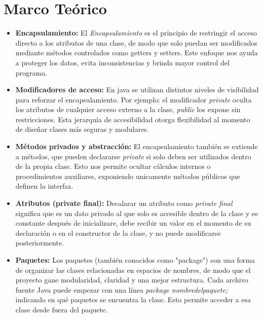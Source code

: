 \documentclass[letterpaper,12pt]{article}
\begin{document}
\section{Marco Teórico}
    \begin{itemize}
        \item \textbf{Encapsulamiento: } El \textit{Encapsulamiento} es el principio de restringir el acceso directo a los atributos de una clase, de modo que solo puedan ser modificados mediante métodos controlados como getters y setters. Este enfoque nos ayuda a proteger los datos, evita inconsistencias y brinda mayor control del programa.~\cite{Encapsulamiento}
        \item \textbf{Modificadores de acceso: } En java se utilizan distintos niveles de visibilidad para reforzar el encapsulamiento. Por ejemplo: el modificador \textit{private} oculta los atributos de cualquier acceso externo a la clase, \textit{public} los expone sin restricciones. Esta jerarquía de accesibilidad otorga flexibilidad al momento de diseñar clases más seguras y modulares.~\cite{Encapsulamiento}
        \item \textbf{Métodos privados y abstracción: } El encapsulamiento también se extiende a métodos, que pueden declararse \textit{private} si solo deben ser utilizados dentro de la propia clase. Esto nos permite ocultar cálculos internos o procedimientos auxiliares, exponiendo unicamente métodos públicos que definen la interfaz.~\cite{Encapsulamiento}
        \item \textbf{Atributos (private final): } Decalarar un atributo como \textit{private final }significa que es un dato privado al que solo es accesible dentro de la clase y es constante después de inicializare, debe recibir un valor en el momento de su declaración o en el constructor de la clase, y no puede modificarse posteriormente.~\cite{Private}
        \item \textbf{Paquetes: } Los paquetes (también conocidos como "package") son una forma de organizar las clases relacionadas en espacios de nombres, de modo que el proyecto gane modularidad, claridad y una mejor estructura.
        Cada archivo fuente Java puede empezar con una línea \textit{package nombredelpaquete; } indicando en qué paquetes se encuentra la clase. Esto permite acceder a esa clase desde fuera del paquete.~\cite{Paquetes}
        
        
    \end{itemize}
\end{document}
